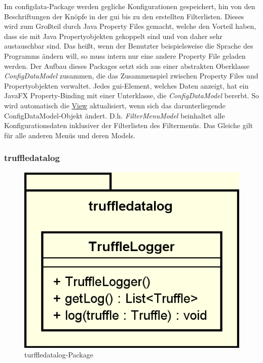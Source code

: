     \medskip
    Im configdata-Package werden gegliche Konfigurationen gespeichert, hin von den
    Beschriftungen der Knöpfe in der \gls{gui} bis zu den erstellten Filterlisten. Dieses
    wird zum Großteil durch Java Property Files gemacht, welche den Vorteil haben, dass
    sie mit Java Propertyobjekten gekoppelt sind und von daher sehr austauschbar sind.
    Das heißt, wenn der Benutzter beispielsweise die Sprache des Programms ändern
    will, so muss intern nur eine andere Property File geladen werden.
    \newline
    \newline
    Der Aufbau dieses Packages setzt sich aus einer abstrakten Oberklasse
    \textit{ConfigDataModel} zusammen, die das Zusammenspiel zwischen Property Files
    und Propertyobjekten verwaltet. Jedes \gls{gui}-Element, welches Daten anzeigt, hat
    ein JavaFX Property-Binding mit einer Unterklasse, die \textit{ConfigDataModel}
    bererbt. So wird automatisch die \hyperref[subsec:view]{View} aktualisiert,
    wenn sich das darunterliegende ConfigDataModel-Objekt ändert. D.h.
    \textit{FilterMenuModel} beinhaltet alle Konfigurationsdaten inklusiver der
    Filterlisten des Filtermenüs. Das Gleiche gilt für alle anderen Menüs und
    deren Models.


    \subsubsection{truffledatalog}
    \label{subsubsec:graphlog}
    
    \begin{figure}[H]
      \centering
      \includegraphics[width=\textwidth]{../diagramimages/truffledatalog.png}
      \caption{turffledatalog-Package}
    \end{figure}
    
